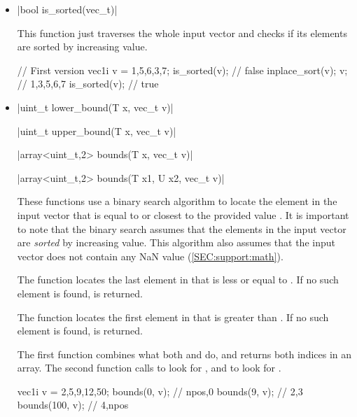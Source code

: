 \documentclass[12pt]{report}
\newenvironment{example}
{
    \begin{mdframed}[style=example,frametitle={Example}]
}
{
    \end{mdframed}
}
\begin{document}
\begin{itemize}
\item \cppinline|bool is_sorted(vec_t)| 

This function just traverses the whole input vector and checks if its elements are sorted by increasing value.

\begin{example}
\begin{cppcode}
// First version
vec1i v = {1,5,6,3,7};
is_sorted(v); // false
inplace_sort(v);
v; // {1,3,5,6,7}
is_sorted(v); // true
\end{cppcode}
\end{example}

\item \cppinline|uint_t lower_bound(T x, vec_t v)| 

\cppinline|uint_t upper_bound(T x, vec_t v)| 

\cppinline|array<uint_t,2> bounds(T x, vec_t v)| 

\cppinline|array<uint_t,2> bounds(T x1, U x2, vec_t v)|

These functions use a binary search algorithm to locate the element in the input vector  that is equal to or closest to the provided value . It is important to note that the binary search assumes that the elements in the input vector are \emph{sorted} by increasing value. This algorithm also assumes that the input vector does not contain any NaN value (\ref{SEC:support:math}).

The  function locates the last element in  that is less or equal to . If no such element is found,  is returned.

The  function locates the first element in  that is greater than . If no such element is found,  is returned.

The first  function combines what both  and  do, and returns both indices in an array. The second  function calls  to look for , and  to look for .

\begin{example}
\begin{cppcode}
vec1i v = {2,5,9,12,50};
bounds(0, v);   // {npos,0}
bounds(9, v);   // {2,3}
bounds(100, v); // {4,npos}
\end{cppcode}
\end{example}


\end{itemize}
\end{document}
